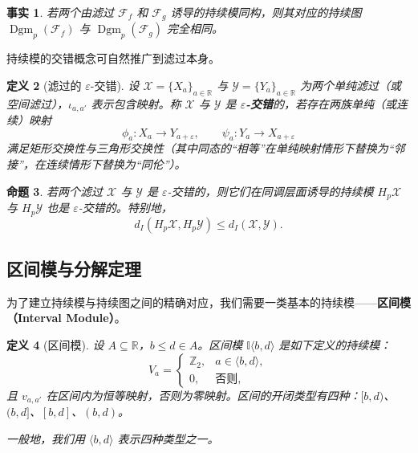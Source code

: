 \documentclass[UTF8]{ctexart}
\newtheorem{definition}{定义}[section]
\newtheorem{proposition}[definition]{命题}
\newtheorem{fact}[definition]{事实}
\begin{document}
\begin{fact}
\label{fact:isomorphic-pd}
若两个由滤过 \(\mathcal{F}_f\) 和 \(\mathcal{F}_g\) 诱导的持续模同构，则其对应的持续图 \(\operatorname{Dgm}_p(\mathcal{F}_f)\) 与 \(\operatorname{Dgm}_p(\mathcal{F}_g)\) 完全相同。
\end{fact}

\label{subsec:filtration-interleaving}

持续模的交错概念可自然推广到滤过本身。

\begin{definition}[滤过的 \(\varepsilon\)-交错]
\label{def:filtration-interleaving}
设 \(\mathcal{X} = \{X_a\}_{a \in \mathbb{R}}\) 与 \(\mathcal{Y} = \{Y_a\}_{a \in \mathbb{R}}\) 为两个单纯滤过（或空间滤过），\(\iota_{a,a'}\) 表示包含映射。称 \(\mathcal{X}\) 与 \(\mathcal{Y}\) 是 \textbf{\(\varepsilon\)-交错}的，若存在两族单纯（或连续）映射
\[
\phi_a: X_a \to Y_{a+\varepsilon}, \qquad \psi_a: Y_a \to X_{a+\varepsilon}
\]
满足矩形交换性与三角形交换性（其中同态的“相等”在单纯映射情形下替换为“邻接”，在连续情形下替换为“同伦”）。
\end{definition}

\begin{proposition}
\label{prop:filtration-interleaving}
若两个滤过 \(\mathcal{X}\) 与 \(\mathcal{Y}\) 是 \(\varepsilon\)-交错的，则它们在同调层面诱导的持续模 \(H_p\mathcal{X}\) 与 \(H_p\mathcal{Y}\) 也是 \(\varepsilon\)-交错的。特别地，
\[
d_I(H_p\mathcal{X}, H_p\mathcal{Y}) \le d_I(\mathcal{X}, \mathcal{Y}).
\]
\end{proposition}

\subsection{区间模与分解定理}
\label{subsec:interval-module}

为了建立持续模与持续图之间的精确对应，我们需要一类基本的持续模——\textbf{区间模（Interval Module）}。

\begin{definition}[区间模]
\label{def:interval-module}
设 \(A \subseteq \mathbb{R}\)，\(b \le d \in A\)。区间模 \(\mathbb{I}\langle b, d \rangle\) 是如下定义的持续模：
\[
V_a = 
\begin{cases}
\mathbb{Z}_2, & a \in \langle b, d \rangle,\\
0, & \text{否则},
\end{cases}
\]
且 \(v_{a,a'}\) 在区间内为恒等映射，否则为零映射。区间的开闭类型有四种：\([b,d)\)、\((b,d]\)、\([b,d]\)、\((b,d)\)。

一般地，我们用 \(\langle b,d \rangle\) 表示四种类型之一。
\end{definition}
\end{document}
